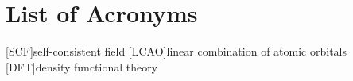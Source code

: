 
\chapter*{List of Acronyms}

\begin{acronym}[ABCDEFGHIJK]
    [SCF]{self-consistent field}
    [LCAO]{linear combination of atomic orbitals}
    [DFT]{density functional theory}
\end{acronym}
